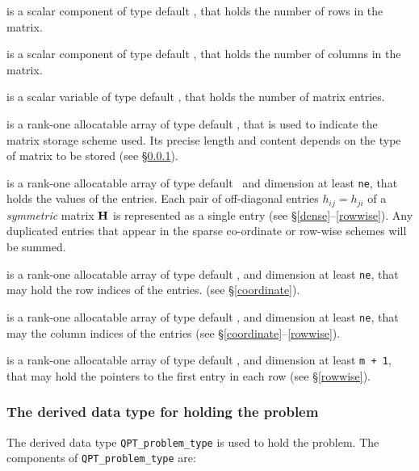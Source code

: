 \documentclass{galahad}
\begin{document}
\begin{description}

 is a scalar component of type default \integer,
that holds the number of rows in the matrix.

 is a scalar component of type default \integer,
that holds the number of columns in the matrix.

 is a scalar variable of type default \integer, that
holds the number of matrix entries.

 is a rank-one allocatable array of type default \character, that
is used to indicate the matrix storage scheme used. Its precise length and
content depends on the type of matrix to be stored (see \S\ref{typeprob}).

 is a rank-one allocatable array of type default \realdp\,
and dimension at least {\tt ne}, that holds the values of the entries.
Each pair of off-diagonal entries $h_{ij} = h_{ji}$ of a {\em symmetric}
matrix ${\mathbf{H}}$ is represented as a single entry
(see \S\ref{dense}--\ref{rowwise}).
Any duplicated entries that appear in the sparse
co-ordinate or row-wise schemes will be summed.

 is a rank-one allocatable array of type default \integer,
and dimension at least {\tt ne}, that may hold the row indices of the entries.
(see \S\ref{coordinate}).

 is a rank-one allocatable array of type default \integer,
and dimension at least {\tt ne}, that may the column indices of the entries
(see \S\ref{coordinate}--\ref{rowwise}).

 is a rank-one allocatable array of type default \integer,
and dimension at least {\tt m + 1}, that may hold the pointers to
the first entry in each row (see \S\ref{rowwise}).

\end{description}


\subsubsection{The derived data type for holding the problem}\label{typeprob}
The derived data type {\tt QPT\_problem\_type} is used to hold
the problem. The components of
{\tt QPT\_problem\_type}
are:
\end{document}
